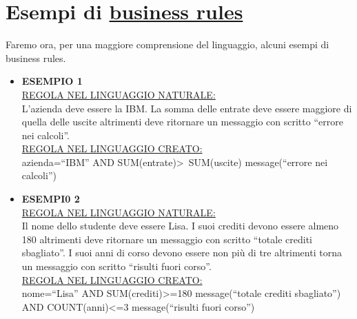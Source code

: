 \section{Esempi di \underline{business rules}}
Faremo ora, per una maggiore comprensione del linguaggio, alcuni esempi di business rules.
\begin{itemize}
\item \textbf{ESEMPIO 1} \\
\underline{REGOLA NEL LINGUAGGIO NATURALE:} \\
L'azienda deve essere la IBM. La somma delle entrate deve essere maggiore di quella delle uscite altrimenti deve ritornare un messaggio con scritto ``errore nei calcoli''. \\
\underline{REGOLA NEL LINGUAGGIO CREATO:} \\
azienda=``IBM'' AND SUM(entrate)\textgreater\ SUM(uscite) message(``errore nei calcoli'')
\item \textbf{ESEMPI0 2} \\
\underline{REGOLA NEL LINGUAGGIO NATURALE:} \\
Il nome dello studente deve essere Lisa. I suoi crediti devono essere almeno 180 altrimenti deve ritornare un messaggio con scritto ``totale crediti sbagliato''. I suoi anni di corso devono essere non pi\`u di tre altrimenti torna un messaggio con scritto ``risulti fuori corso''.  \\
\underline{REGOLA NEL LINGUAGGIO CREATO:} \\
nome=``Lisa'' AND SUM(crediti)\textgreater =180 message(``totale crediti sbagliato'') AND COUNT(anni)\textless =3 message(``risulti fuori corso'')
\end{itemize}
